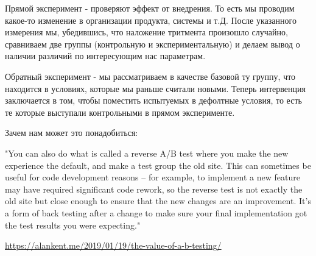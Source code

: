 Прямой эксперимент - проверяют эффект от внедрения. То есть мы проводим какое-то изменение в организации продукта, системы и т.Д. После указанного измерения мы, убедившись, что наложение тритмента произошло случайно, сравниваем две группы (контрольную и экспериментальную)  и делаем вывод о наличии различий по интересующим нас параметрам. 

Обратный эксперимент - мы рассматриваем в качестве базовой ту группу, что находится в условиях, которые мы раньше считали новыми. Теперь интервенция заключается в том, чтобы поместить испытуемых в дефолтные условия, то есть те которые выступали контрольными в прямом эксперименте. 

Зачем нам может это понадобиться:

"You can also do what is called a reverse A/B test where you make the new experience the default, and make a test group the old site. This can sometimes be useful for code development reasons – for example, to implement a new feature may have required significant code rework, so the reverse test is not exactly the old site but close enough to ensure that the new changes are an improvement. It’s a form of back testing after a change to make sure your final implementation got the test results you were expecting." 

\url{https://alankent.me/2019/01/19/the-value-of-a-b-testing/}
